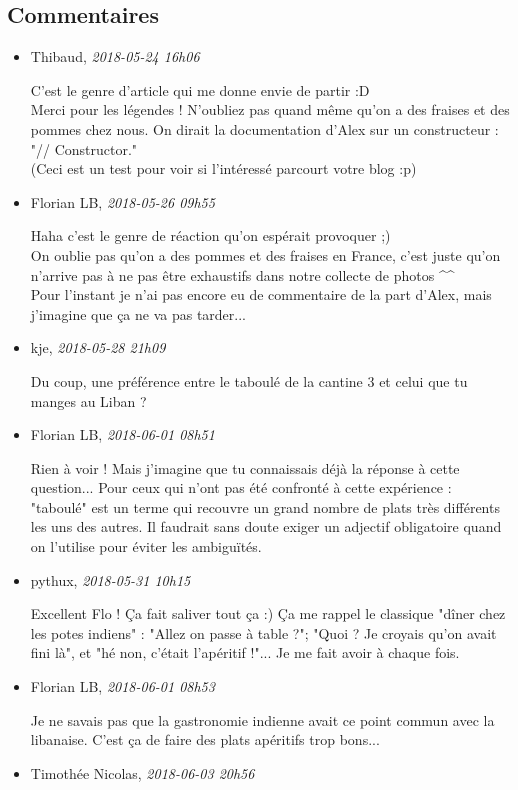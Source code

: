 \documentclass[]{article}
\date{}
\begin{document}
\hypertarget{commentaires}{%
\subsection{Commentaires}\label{commentaires}}

\begin{itemize}
\item
  Thibaud, \emph{2018-05-24 16h06}

  C'est le genre d'article qui me donne envie de partir :D\\
  Merci pour les légendes ! N'oubliez pas quand même qu'on a des fraises
  et des pommes chez nous. On dirait la documentation d'Alex sur un
  constructeur : "// Constructor."\\
  (Ceci est un test pour voir si l'intéressé parcourt votre blog :p)
\item
  Florian LB, \emph{2018-05-26 09h55}

  Haha c'est le genre de réaction qu'on espérait provoquer ;)\\
  On oublie pas qu'on a des pommes et des fraises en France, c'est juste
  qu'on n'arrive pas à ne pas être exhaustifs dans notre collecte de
  photos \^{}\^{}\\
  Pour l'instant je n'ai pas encore eu de commentaire de la part d'Alex,
  mais j'imagine que ça ne va pas tarder...
\item
  kje, \emph{2018-05-28 21h09}

  Du coup, une préférence entre le taboulé de la cantine 3 et celui que
  tu manges au Liban ?
\item
  Florian LB, \emph{2018-06-01 08h51}

  Rien à voir ! Mais j'imagine que tu connaissais déjà la réponse à
  cette question... Pour ceux qui n'ont pas été confronté à cette
  expérience : "taboulé" est un terme qui recouvre un grand nombre de
  plats très différents les uns des autres. Il faudrait sans doute
  exiger un adjectif obligatoire quand on l'utilise pour éviter les
  ambiguïtés.
\item
  pythux, \emph{2018-05-31 10h15}

  Excellent Flo ! Ça fait saliver tout ça :) Ça me rappel le classique
  "dîner chez les potes indiens" : "Allez on passe à table ?"; "Quoi ?
  Je croyais qu'on avait fini là", et "hé non, c'était l'apéritif !"...
  Je me fait avoir à chaque fois.
\item
  Florian LB, \emph{2018-06-01 08h53}

  Je ne savais pas que la gastronomie indienne avait ce point commun
  avec la libanaise. C'est ça de faire des plats apéritifs trop bons...
\item
  Timothée Nicolas, \emph{2018-06-03 20h56}


\end{itemize}
\end{document}
